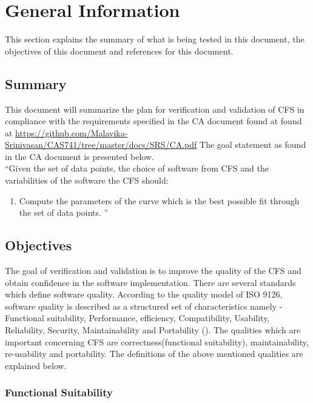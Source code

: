 \documentclass[12pt, titlepage]{article}
\newcommand{\famname}{CFS} %
\begin{document}
\section{General Information}

This section explains the summary of what is being tested in this document, the objectives of this document and references for this document. 


\subsection{Summary}

This document will summarize the plan for verification and validation of \famname{} in compliance with the requirements specified in the CA document found at found at \url{https://github.com/Malavika-Srinivasan/CAS741/tree/master/docs/SRS/CA.pdf} 
The goal statement as found in the CA document is presented below.\\
\noindent ``Given the set of data points, the choice of software from \famname{} and the variabilities of the software the \famname{} should:

\begin{enumerate}
	
	\item Compute the parameters of the curve which is the best possible fit through the set of data points.	''
\end{enumerate}


\subsection{Objectives}

The goal of verification and validation is to improve the quality of the \famname{} and obtain confidence in the software implementation. There are several standards which define software quality. According to the quality model of ISO 9126,  software quality is described as a structured set of characteristics namely - Functional suitability, Performance, efficiency, Compatibility, Usability,  Reliability, Security, Maintainability and Portability (\cite{ISO9126}). The qualities which are important concerning \famname{} are correctness(functional suitability), maintainability, re-usability and portability. The definitions of the above mentioned qualities are explained below.

\subsubsection {Functional Suitability}
\end{document}
